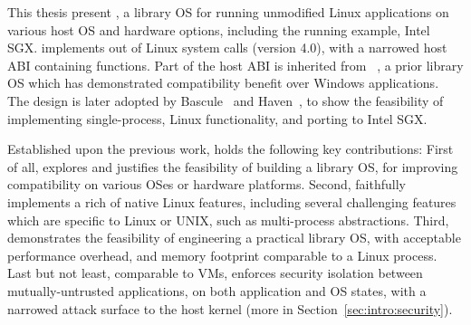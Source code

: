 This thesis present \graphene{}, a library OS for running unmodified Linux applications on various host OS and hardware options, including the running example, Intel SGX.
\graphene{} implements \graphenesyscalls{} out of \linuxsyscalls{} Linux system calls (version 4.0), with a narrowed host ABI containing \palcalls{} functions.
Part of the host ABI is inherited from \drawbridge{}~\cite{porter11drawbridge}, a prior library OS which has demonstrated compatibility benefit over
Windows applications.
The \drawbridge{} design is later adopted by Bascule~\cite{baumann13bascule} and Haven~\cite{baumann14haven}, to show the feasibility of implementing single-process, Linux functionality, and porting to Intel SGX.

Established upon the previous work, \graphene{} holds the following key contributions:
First of all, \graphene{} explores and justifies the feasibility of building a library OS, for improving compatibility on various OSes or hardware platforms.
Second, \graphene{} faithfully implements a rich of native Linux features, including several challenging features which are specific to Linux or UNIX,
such as multi-process abstractions.
Third, \graphene{} demonstrates the feasibility of engineering a practical library OS,
with acceptable performance overhead,
and memory footprint comparable to a Linux process.
Last but not least, comparable to VMs, \graphene{} enforces security isolation
between mutually-untrusted applications, on both application and OS states,
with a narrowed attack surface to the host kernel (more in Section~\ref{sec:intro:security}).






